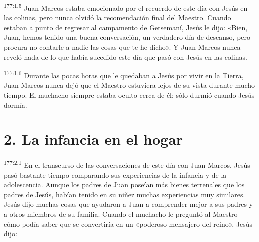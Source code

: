 \par 
\textsuperscript{177:1.5} Juan Marcos estaba emocionado por el recuerdo de este día con Jesús en las colinas, pero nunca olvidó la recomendación final del Maestro. Cuando estaban a punto de regresar al campamento de Getsemaní, Jesús le dijo: «Bien, Juan, hemos tenido una buena conversación, un verdadero día de descanso, pero procura no contarle a nadie las cosas que te he dicho». Y Juan Marcos nunca reveló nada de lo que había sucedido este día que pasó con Jesús en las colinas.

\par 
\textsuperscript{177:1.6} Durante las pocas horas que le quedaban a Jesús por vivir en la Tierra, Juan Marcos nunca dejó que el Maestro estuviera lejos de su vista durante mucho tiempo. El muchacho siempre estaba oculto cerca de él; sólo durmió cuando Jesús dormía.

\section*{2. La infancia en el hogar}
\par 
\textsuperscript{177:2.1} En el transcurso de las conversaciones de este día con Juan Marcos, Jesús pasó bastante tiempo comparando sus experiencias de la infancia y de la adolescencia. Aunque los padres de Juan poseían más bienes terrenales que los padres de Jesús, habían tenido en su niñez muchas experiencias muy similares. Jesús dijo muchas cosas que ayudaron a Juan a comprender mejor a sus padres y a otros miembros de su familia. Cuando el muchacho le preguntó al Maestro cómo podía saber que se convertiría en un «poderoso mensajero del reino», Jesús dijo:

